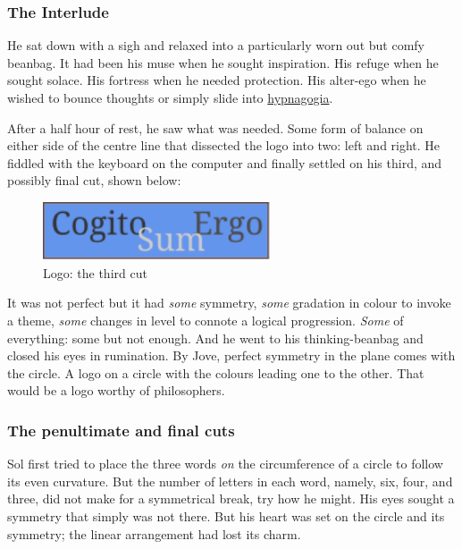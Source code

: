 \documentclass[
  a4paper,
]{article}
\begin{document}
\hypertarget{the-interlude}{%
\subsubsection{The Interlude}\label{the-interlude}}

He sat down with a sigh and relaxed into a particularly worn out but
comfy beanbag. It had been his muse when he sought inspiration. His
refuge when he sought solace. His fortress when he needed protection.
His alter-ego when he wished to bounce thoughts or simply slide into
\href{https://en.wikipedia.org/wiki/Hypnagogia}{hypnagogia}.

After a half hour of rest, he saw what was needed. Some form of balance
on either side of the centre line that dissected the logo into two: left
and right. He fiddled with the keyboard on the computer and finally
settled on his third, and possibly final cut, shown below:

\begin{figure}
\centering
\includegraphics[width=0.6\textwidth,height=\textheight]{images/thirdcut.svg}
\caption{Logo: the third cut}
\end{figure}

It was not perfect but it had \emph{some} symmetry, \emph{some}
gradation in colour to invoke a theme, \emph{some} changes in level to
connote a logical progression. \emph{Some} of everything: some but not
enough. And he went to his thinking-beanbag and closed his eyes in
rumination. By Jove, perfect symmetry in the plane comes with the
circle. A logo on a circle with the colours leading one to the other.
That would be a logo worthy of philosophers.

\hypertarget{the-penultimate-and-final-cuts}{%
\subsubsection{The penultimate and final
cuts}\label{the-penultimate-and-final-cuts}}

Sol first tried to place the three words \emph{on} the circumference of
a circle to follow its even curvature. But the number of letters in each
word, namely, six, four, and three, did not make for a symmetrical
break, try how he might. His eyes sought a symmetry that simply was not
there. But his heart was set on the circle and its symmetry; the linear
arrangement had lost its charm.
\end{document}
